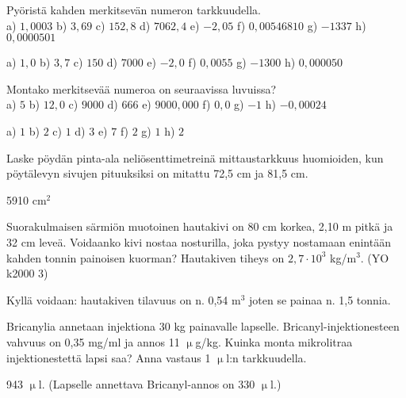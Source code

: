 \begin{tehtavasivu}
\begin{tehtava}
Pyöristä kahden merkitsevän numeron tarkkuudella. \\
a) $1,0003$ \qquad
b) $3,69$ \qquad
c) $152,8$ \qquad
d) $7062,4$ \qquad
e) $-2,05$ \qquad
f) $0,00546810$ \qquad
g) $-1337$ \qquad
h) $0,0000501$
\begin{vastaus}
a) $1,0$ \qquad
b) $3,7$ \qquad
c) $150$ \qquad
d) $7000$ \qquad
e) $-2,0$ \qquad
f) $0,0055$ \qquad
g) $-1300$ \qquad
h) $0,000050$
\end{vastaus}
\end{tehtava}

\begin{tehtava}
Montako merkitsevää numeroa on seuraavissa luvuissa? \\
a) $5$ \qquad
b) $12,0$ \qquad
c) $9000$ \qquad
d) $666$ \qquad
e) $9000,000$ \qquad
f) $0,0$ \qquad
g) $-1$ \qquad
h) $-0,00024$
\begin{vastaus}
a) $1$ \qquad
b) $2$ \qquad
c) $1$ \qquad
d) $3$ \qquad
e) $7$ \qquad
f) $2$ \qquad
g) $1$ \qquad
h) $2$
\end{vastaus}
\end{tehtava}

\begin{tehtava}
Laske pöydän pinta-ala neliösenttimetreinä mittaustarkkuus huomioiden,
kun pöytälevyn sivujen pituuksiksi on mitattu 72,5 cm ja 81,5 cm.
\begin{vastaus}
5910 cm$^2$
\end{vastaus}
\end{tehtava}

\begin{tehtava}
Suorakulmaisen särmiön muotoinen hautakivi on 80 cm korkea, 2,10 m pitkä ja 32 cm leveä.
Voidaanko kivi nostaa nosturilla, joka pystyy nostamaan enintään kahden tonnin painoisen kuorman?
Hautakiven tiheys on $2,7 \cdot 10^3$ kg/m$^3$. (YO k2000 3)
\begin{vastaus}
Kyllä voidaan: hautakiven tilavuus on n. 0,54 m$^3$ joten se painaa n. 1,5 tonnia.
\end{vastaus}
\end{tehtava}

\begin{tehtava}
 Bricanylia annetaan injektiona 30 kg painavalle lapselle. Bricanyl-injektionesteen vahvuus on 
 0,35 mg/ml ja annos 11 $\upmu$g/kg. Kuinka monta mikrolitraa injektionestettä lapsi saa? Anna 
 vastaus 1 $\upmu$l:n tarkkuudella.
 \begin{vastaus}
  943 $\upmu$l. (Lapselle annettava Bricanyl-annos on 330 $\upmu$l.)
 \end{vastaus}
\end{tehtava}


\end{tehtavasivu}
